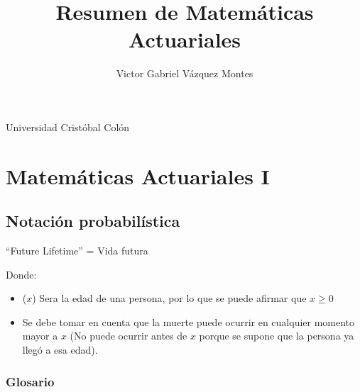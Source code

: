 \documentclass[12pt, a4paper, footinclude=true]{scrbook}
\title{Resumen de Matemáticas Actuariales}
\author{Victor Gabriel Vázquez Montes}
\begin{document}
\begin{titlepage}
	
	\huge{Universidad Cristóbal Colón}


\end{titlepage}


\tableofcontents

\chapter{Matemáticas Actuariales I}

\section{Notación probabilística}

``Future Lifetime'' = Vida futura
\begin{center}
\end{center}

Donde: 

\begin{itemize}
\item ($x$) Sera la edad de una persona, por lo que se puede afirmar que $x \geq 0$
\item Se debe tomar en cuenta que la muerte puede ocurrir en cualquier momento mayor a $x$ (No puede ocurrir antes de $x$ porque se supone que la persona ya llegó a esa edad). 
\end{itemize}

\subsection{Glosario}
\end{document}
